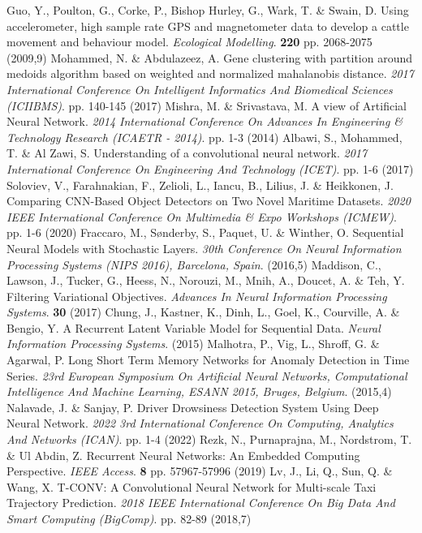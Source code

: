 Guo, Y., Poulton, G., Corke, P., Bishop Hurley, G., Wark, T. \& Swain, D. Using accelerometer, high sample rate GPS and magnetometer data to develop a cattle movement and behaviour model. {\em Ecological Modelling}. \textbf{220} pp. 2068-2075 (2009,9)
Mohammed, N. \& Abdulazeez, A. Gene clustering with partition around medoids algorithm based on weighted and normalized mahalanobis distance. {\em 2017 International Conference On Intelligent Informatics And Biomedical Sciences (ICIIBMS)}. pp. 140-145 (2017)
Mishra, M. \& Srivastava, M. A view of Artificial Neural Network. {\em 2014 International Conference On Advances In Engineering \& Technology Research (ICAETR - 2014)}. pp. 1-3 (2014)
Albawi, S., Mohammed, T. \& Al Zawi, S. Understanding of a convolutional neural network. {\em 2017 International Conference On Engineering And Technology (ICET)}. pp. 1-6 (2017)
Soloviev, V., Farahnakian, F., Zelioli, L., Iancu, B., Lilius, J. \& Heikkonen, J. Comparing CNN-Based Object Detectors on Two Novel Maritime Datasets. {\em 2020 IEEE International Conference On Multimedia \& Expo Workshops (ICMEW)}. pp. 1-6 (2020)
Fraccaro, M., Sønderby, S., Paquet, U. \& Winther, O. Sequential Neural Models with Stochastic Layers. {\em 30th Conference On Neural Information Processing Systems (NIPS 2016), Barcelona, Spain}. (2016,5)
Maddison, C., Lawson, J., Tucker, G., Heess, N., Norouzi, M., Mnih, A., Doucet, A. \& Teh, Y. Filtering Variational Objectives. {\em Advances In Neural Information Processing Systems}. \textbf{30} (2017)
Chung, J., Kastner, K., Dinh, L., Goel, K., Courville, A. \& Bengio, Y. A Recurrent Latent Variable Model for Sequential Data. {\em Neural Information Processing Systems}. (2015)
Malhotra, P., Vig, L., Shroff, G. \& Agarwal, P. Long Short Term Memory Networks for Anomaly Detection in Time Series. {\em 23rd European Symposium On Artificial Neural Networks, Computational Intelligence And Machine Learning, ESANN 2015, Bruges, Belgium}. (2015,4)
Nalavade, J. \& Sanjay, P. Driver Drowsiness Detection System Using Deep Neural Network. {\em 2022 3rd International Conference On Computing, Analytics And Networks (ICAN)}. pp. 1-4 (2022)
Rezk, N., Purnaprajna, M., Nordstrom, T. \& Ul Abdin, Z. Recurrent Neural Networks: An Embedded Computing Perspective. {\em IEEE Access}. \textbf{8} pp. 57967-57996 (2019)
Lv, J., Li, Q., Sun, Q. \& Wang, X. T-CONV: A Convolutional Neural Network for Multi-scale Taxi Trajectory Prediction. {\em 2018 IEEE International Conference On Big Data And Smart Computing (BigComp)}. pp. 82-89 (2018,7)
